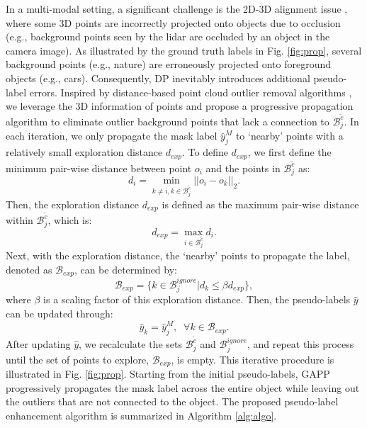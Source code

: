 In a multi-modal setting, a significant challenge is the 2D-3D alignment issue \cite{an2020geometric}, where some 3D points are incorrectly projected onto objects due to occlusion (e.g., background points seen by the lidar are occluded by an object in the camera image). As illustrated by the ground truth labels in Fig. \ref{fig:prop}, several background points (e.g., nature) are erroneously projected onto foreground objects (e.g., cars). Consequently, DP inevitably introduces additional pseudo-label errors. Inspired by distance-based point cloud outlier removal algorithms \cite{zhang2009new, ning2018efficient}, we leverage the 3D information of points and propose a progressive propagation algorithm to eliminate outlier background points that lack a connection to $\mathcal{B}_j^{\tilde{c}}$. In each iteration, we only propagate the mask label $\hat{y}^M_j$ to `nearby' points with a relatively small exploration distance $d_{exp}$. To define $d_{exp}$, we first define the minimum pair-wise distance between point $o_i$ and the points in $\mathcal{B}_j^{\tilde{c}}$ as: 
\begin{equation}
d_i = \min_{k \neq i, k \in \mathcal{B}_j^{\tilde{c}}} || o_i - o_k ||_2.
\end{equation}
Then, the exploration distance $d_{exp}$ is defined as the maximum pair-wise distance within $\mathcal{B}_j^{\tilde{c}}$, which is:
\begin{equation}
d_{exp} = \max_{i \in \mathcal{B}_j^{\tilde{c}}} d_i. 
\label{equ:dist}
\end{equation}
Next, with the exploration distance, the `nearby' points to propagate the label, denoted as $\mathcal{B}_{exp}$, can be determined by:
\begin{equation}
\mathcal{B}_{exp} = \{ k \in \mathcal{B}_j^{ignore} | d_k \leq \beta d_{exp}\},
\label{equ:exp}
\end{equation}
where $\beta$ is a scaling factor of this exploration distance. Then, the pseudo-labels $\hat{y}$ can be updated through:
\begin{equation}
\hat{y}_k = \hat{y}^M_j, \;\; \forall k \in \mathcal{B}_{exp}.
\label{equ:update}
\end{equation}
After updating $\hat{y}$, we recalculate the sets $\mathcal{B}_j^{\tilde{c}}$ and $\mathcal{B}_j^{ignore}$, and repeat this process until the set of points to explore, $\mathcal{B}_{exp}$, is empty. This iterative procedure is illustrated in Fig. \ref{fig:prop}. Starting from the initial pseudo-labels, GAPP progressively propagates the mask label across the entire object while leaving out the outliers that are not connected to the object. The proposed pseudo-label enhancement algorithm is summarized in Algorithm \ref{alg:algo}. 
   

